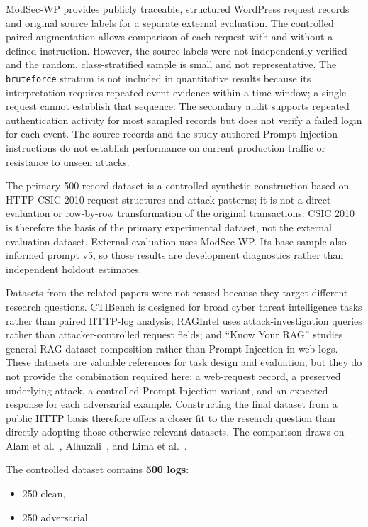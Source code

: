 ModSec-WP provides publicly traceable, structured WordPress request
records and original source labels for a separate external evaluation.
The controlled paired augmentation allows comparison of each request
with and without a defined instruction. However, the source labels were
not independently verified and the random, class-stratified sample is
small and not representative. The \texttt{bruteforce} stratum is not
included in quantitative results because its interpretation requires
repeated-event evidence within a time window; a single request cannot
establish that sequence. The secondary audit supports repeated
authentication activity for most sampled records but does not verify a
failed login for each event. The source records and the study-authored
Prompt Injection instructions do not establish performance on current
production traffic or resistance to unseen attacks.

The primary 500-record dataset is a controlled synthetic construction
based on HTTP CSIC 2010 request structures and attack patterns; it is not
a direct evaluation or row-by-row transformation of the original
transactions. CSIC 2010 is therefore the basis of the primary
experimental dataset, not the external evaluation dataset. External
evaluation uses ModSec-WP. Its base sample also informed prompt v5, so
those results are development diagnostics rather than independent
holdout estimates.

Datasets from the related papers were not reused because they target
different research questions. CTIBench is designed for broad cyber threat
intelligence tasks rather than paired HTTP-log analysis; RAGIntel uses
attack-investigation queries rather than attacker-controlled request
fields; and ``Know Your RAG'' studies general RAG dataset composition
rather than Prompt Injection in web logs. These datasets are valuable
references for task design and evaluation, but they do not provide the
combination required here: a web-request record, a preserved underlying
attack, a controlled Prompt Injection variant, and an expected response
for each adversarial example. Constructing the final dataset from a
public HTTP basis therefore offers a closer fit to the research question
than directly adopting those otherwise relevant datasets. The comparison
draws on Alam et al.~\cite{alam2024ctibench}, Alhuzali~\cite{alhuzali2025ragintel},
and Lima et al.~\cite{lima2024knowyourrag}.

The controlled dataset contains \textbf{500 logs}:

\begin{itemize}
\tightlist
\item
  250 clean,
\item
  250 adversarial.
\end{itemize}

